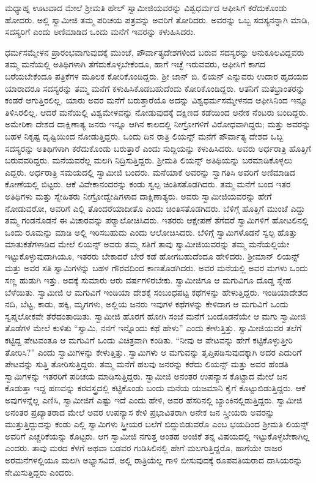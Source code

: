  ಮಧ್ಯಾಹ್ನ ಊಟವಾದ ಮೇಲೆ ಶ‍್ರೀಮತಿ ಹೇಲ್ ಸ್ವಾಮೀಜಿಯವರನ್ನು ವಿಶ್ವಧರ್ಮದ ಆಫೀಸಿಗೆ ಕರೆದುಕೊಂಡು ಹೋದರು. ಅಲ್ಲಿ ಸ್ವಾಮೀಜಿ ತಮ್ಮ ಪರಿಚಯ ಪತ್ರವನ್ನು ಅವರಿಗೆ ತೋರಿದರು. ಅವರನ್ನು ಒಬ್ಬ ಸದಸ್ಯನನ್ನಾಗಿ ಮಾಡಿ, ಸದಸ್ಯರಿಗೆ ಎಂದು ಅಣಿಮಾಡಿದ ಒಂದು ಮನೆಗೆ ಇವರನ್ನು ಕಳುಹಿಸಿದರು. 

 ಧರ್ಮಸಮ್ಮೇಳನ ಪ್ರಾರಂಭವಾಗುವುದಕ್ಕೆ ಮುಂಚೆ, ಪೌರ್ವಾತ್ಯದೇಶಗಳಿಂದ ಬರುವ ಸದಸ್ಯರನ್ನು ಅನುಕೂಲವಿದ್ದವರು ತಮ್ಮ ಮನೆಯಲ್ಲಿ ಅತಿಥಿಗಳಾಗಿ ತೆಗೆದುಕೊಳ್ಳಬೇಕೆಂದೂ, ಹಾಗೆ ಇಚ್ಛೆ ಇರುವವರು, ಆಫೀಸಿಗೆ ಕಾಗದ ಬರೆಯಬೇಕೆಂದೂ ಪತ್ರಿಕೆಗಳ ಮೂಲಕ ಕೋರಿಕೊಂಡಿದ್ದರು. ಶ‍್ರೀ ಜಾನ್ ಬಿ. ಲಿಯನ್ ಎನ್ನುವರು ಉದಾರ ಹೃದಯದ ಯಾರಾದರೂ ಸದಸ್ಯರನ್ನು ತಮ್ಮ ಮನೆಗೆ ಕಳುಹಿಸಿಕೊಡಬಹುದೆಂದು ಕೋರಿಕೊಂಡಿದ್ದರು. ಆತನಿಗೆ ಮತಭ್ರಾಂತರನ್ನು ಕಂಡರೆ ಆಗುತ್ತಿರಲಿಲ್ಲ. ಯಾರು ಅವರ ಮನೆಗೆ ಬರುತ್ತಾರೆಯೊ ಅದನ್ನು ವಿಶ್ವಧರ್ಮಸಮ್ಮೇಳನದ ಆಫೀಸಿನಿಂದ ಇನ್ನೂ ತಿಳಿಸಿರಲಿಲ್ಲ. ಆದರೆ ಮನೆಯಲ್ಲಿ ವಿಶ್ವಮೇಳವನ್ನು ನೋಡುವುದಕ್ಕೆ ದಕ್ಷಿಣದ ಕಡೆಯಿಂದ ಅನೇಕ ನೆಂಟರು ಬಂದಿದ್ದರು. ಅಮೇರಿಕಾ ದೇಶದ ದಾಕ್ಷಿಣಾತ್ಯ ಜನರು ಇನ್ನೂ ಆಗಿನ ಕಾಲದಲ್ಲಿ ನೀಗ್ರೋಗಳಿಗೆ ವಿರೋಧವಾಗಿದ್ದರು; ಮತ್ತು ಅವರನ್ನು ಬಹಳ ನಿಕೃಷ್ಟ ದೃಷ್ಟಿಯಿಂದ ನೋಡುತ್ತಿದ್ದರು. ಒಂದು ದಿನ ರಾತ್ರಿ ಲಿಯನ್ಸ್ ಮನೆಗೆ ಪೌರ್ವಾತ್ಯ ದೇಶದ ಒಬ್ಬ ಸದಸ್ಯರನ್ನು ಅತಿಥಿಗಳಾಗಿ ಕರೆದುಕೊಂಡು ಬರುತ್ತಾರೆ ಎಂದು ಸುದ್ದಿಯನ್ನು ಕಳುಹಿಸಿದರು. ಅವರು ಅರ್ಧರಾತ್ರಿ ಹೊತ್ತಿಗೆ ಬರುವವರಿದ್ದರು. ಮನೆಯವರೆಲ್ಲ ಮಲಗಿ ನಿದ್ರಿಸುತ್ತಿದ್ದರು. ಶ‍್ರೀಮತಿ ಲಿಯನ್ಸ್ ಅತಿಥಿಯನ್ನು ಬರಮಾಡಿಕೊಳ್ಳಲು ಎದ್ದರು. ಅರ್ಧರಾತ್ರಿ ಸಮಯದಲ್ಲಿ ಸ್ವಾಮೀಜಿ ಬಂದರು. ಮನೆಯಾಕೆ ಅವರನ್ನು ಸ್ವಾಗತಿಸಿ ಅವರಿಗೆ ಅಣಿಮಾಡಿದ ಕೋಣೆಯಲ್ಲಿ ಬಿಟ್ಟರು. ಆಕೆ ವಿವೇಕಾನಂದರನ್ನು ಕಂಡು ಸ್ವಲ್ಪ ಚಿಂತಿಸತೊಡಗಿದರು. ತಮ್ಮ ಮನೆಗೆ ಬಂದ ಇತರ ಅತಿಥಿಗಳು ಮತ್ತು ಸ್ನೇಹಿತರು ನೀಗ್ರೋದ್ವೇಷಿಗಳಾದ ದಾಕ್ಷಿಣಾತ್ಯರು. ಅವರು ಸ್ವಾಮೀಜಿಯವರನ್ನು ಹೇಗೆ ನೋಡುವರೋ, ಅವರಿಗೆ ಎಲ್ಲಿ ತೊಂದರೆಯಾದೀತೊ ಎಂದು ಚಿಂತಿಸತೊಡಗಿದರು. ಬೆಳಿಗ್ಗೆ ಹೊತ್ತಿಗೆ ಮುಂಚೆ ಎದ್ದು ತಮ್ಮ ಗಂಡನೊಡನೆ ಈ ವಿಚಾರವನ್ನು ಪರ‍್ಯಾಲೋಚಿಸಿದರು. ಇತರರು ಆಕ್ಷೇಪಣೆ ತೆಗೆದರೆ ಸ್ವಾಮಿಗಳಿಗೆ ಹೋಟಲಿನಲ್ಲಿ ಒಂದು ರೂಮನ್ನು ಮಾಡಿ ಅಲ್ಲಿ ಇರಿಸಬಹುದು ಎಂದು ಆಲೋಚಿಸಿದರು. ಬೆಳಿಗ್ಗೆ ಸ್ವಾಮಿಗಳೊಡನೆ ಸ್ವಲ್ಪ ಹೊತ್ತು ಮಾತುಕತೆಗಳಾಡಿದ ಮೇಲೆ ಲಿಯನ್ಸ್ ಅವರು ತಮ್ಮ ಸತಿಗೆ ತಾವು ಸ್ವಾಮೀಜಿಯವರನ್ನು ತಮ್ಮ ಮನೆಯಲ್ಲಿಯೇ ಇಟ್ಟುಕೊಳ್ಳುವುದಾಗಿಯೂ, ಇತರರು ಬೇಕಾದರೆ ಬೇರೆ ಕಡೆ ಹೋಗಬಹುದೆಂದೂ ಹೇಳಿದರು. ಶ‍್ರೀಮಾನ್ ಲಿಯನ್ಸ್ ಮತ್ತು ಅವರ ಸತಿ ಸ್ವಾಮಿಗಳನ್ನು ಬಹಳ ಗೌರವದಿಂದ ಕಾಣತೊಡಗಿದರು. ಅವರ ಮನೆಯಲ್ಲಿ ಅವರ ಮಗಳು ಒಂದು ಸಣ್ಣ ಹುಡುಗಿ ಇತ್ತು. ಅದಕ್ಕೆ ಸುಮಾರು ಆರು ವರ್ಷಗಳಿರಬೇಕು. ಸ್ವಾಮೀಜಿಗೂ ಆ ಮಗುವಿಗೂ ದೊಡ್ಡ ಸ್ನೇಹ ಬೆಳೆಯಿತು. ಸ್ವಾಮೀಜಿ ಆ ಮಗುವಿಗೆ ಇಂಡಿಯಾ ದೇಶಕ್ಕೆ ಸಂಬಂಧಪಟ್ಟ ಕಥೆಗಳನ್ನು ಹೇಳುತ್ತಿದ್ದರು. ಇಂಡಿಯಾದೇಶದ ನದಿ, ಬೆಟ್ಟ, ಕಾಡು, ಹಕ್ಕಿ, ಮೃಗಗಳು, ಅಲ್ಲಿಯ ಜನರು ಇವುಗಳ ಕಥೆಗಳನ್ನು ಕೇಳಿದಾಗ ಆ ಮಗುವಿಗೆ ಒಂದು ಸ್ವಪ್ನಲೋಕವೇ ತೆರೆದಂತಾಯಿತು. ಸ್ವಾಮೀಜಿ ಹೊರಗೆ ಹೋಗಿ ಸಂಜೆ ಮನೆಗೆ ಬಂದೊಡನೆಯೇ ಆ ಮಗು ಸ್ವಾಮೀಜಿ ತೊಡೆಗಳ ಮೇಲೆ ಕುಳಿತು “ಸ್ವಾಮಿ, ನನಗೆ ಇನ್ನೊಂದು ಕಥೆ ಹೇಳು” ಎಂದು ಕೇಳುತ್ತಿತ್ತು. ಸ್ವಾಮೀಜಿಯವರ ತಲೆಗೆ ಕಟ್ಟಿದ್ದ ಪೇಟವಂತೂ ಆ ಮಗುವಿಗೆ ಒಂದು ವಿಚಿತ್ರವಾಗಿ ಕಂಡಿತು. “ನೀವು ಆ ಪೇಟವನ್ನು ಹೇಗೆ ಕಟ್ಟಿಕೊಳ್ಳುತ್ತೀರಿ ತೋರಿಸಿ?” ಎಂದು ಸ್ವಾಮಿಗಳನ್ನು ಕೇಳುತ್ತಿತ್ತು. ಸ್ವಾಮಿಗಳು ಆ ಮಗುವನ್ನು ತೃಪ್ತಿಪಡಿಸುವುದಕ್ಕಾಗಿ ಅದರ ಎದುರಿಗೆ ಪೇಟವನ್ನು ಸುತ್ತಿ ತೋರಿಸುತ್ತಿದ್ದರು. ತಮ್ಮ ಮನೆಗೆ ಹಲವು ಜನರನ್ನು ಕರೆದು ಲಿಯನ್ಸ್ ಮತ್ತು ಅವರ ಹೆಂಡತಿ ಸ್ವಾಮಿಗಳನ್ನು ಇತರರಿಗೆ ಪರಿಚಯ ಮಾಡಿಸುತ್ತಿದ್ದರು. ಸ್ವಾಮೀಜಿ ಅನಂತರ ಉಪನ್ಯಾಸ ಕೊಟ್ಟಾದ ಮೇಲೆ ಜನ ಕೊಡುತ್ತಾ ಇದ್ದ ಹಣವನ್ನು ಕರವಸ್ತ್ರದಲ್ಲಿ ಕಟ್ಟಿಕೊಂಡು ಬಂದು ಮನೆಯ ಯಜಮಾನಿ ಕೈಗೆ ಕೊಟ್ಟುಬಿಡುತ್ತಿದ್ದರು. ಆಕೆ ಅವುಗಳನ್ನೆಲ್ಲ ಎಣಿಸಿ, ಸ್ವಾಮೀಜಿಗೆ ಎಷ್ಟು ಇದೆ ಎಂದು ಹೇಳಿ, ಅವರ ಹೆಸರಿನಲ್ಲಿ ಬ್ಯಾಂಕಿನಲ್ಲಿಡುತ್ತಿದ್ದರು. ಸ್ವಾಮೀಜಿ ಅನಂತರ ಪ್ರಖ್ಯಾತರಾದ ಮೇಲೆ ಅವರ ಉಪನ್ಯಾಸ ಕೇಳಿ ಪ್ರಭಾವಿತರಾಗಿ ಅನೇಕ ಜನ ಸ್ತ್ರೀಯರು ಅವರನ್ನು ಮುತ್ತುತ್ತಿದ್ದುದನ್ನು ಕಂಡು ಎಲ್ಲಿ ಸ್ವಾಮಿಗಳು ಸ್ತ್ರೀಯರ ಬಲೆಗೆ ಬಿದ್ದುಬಿಡುವರೊ ಎಂಬ ಭಯದಿಂದ ಶ‍್ರೀಮತಿ ಲಿಯನ್ಸ್ ಅವರಿಗೆ ಎಚ್ಚರಿಕೆಯನ್ನು ಕೊಟ್ಟರು. ಆಗ ಸ್ವಾಮೀಜಿ ನಗುತ್ತ ಅಂತಹ ಅಂಜಿಕೆ ತನ್ನ ವಿಷಯದಲ್ಲಿ ಇಟ್ಟುಕೊಳ್ಳಬೇಕಾಗಿಲ್ಲ ಎಂದರು. ತಾವು ಮರದ ಕೆಳಗೆ ಅಥವಾ ಬಡವರ ಗುಡಿಸಿಲಿನಲ್ಲಿ ಹೇಗೆ ಮಲಗುತ್ತಿದ್ದರೊ, ಹಾಗೆಯೇ ರಾಜರ ಅರಮನೆಗಳಲ್ಲಿಯೂ ಮಲಗಿ ಅಭ್ಯಾಸವಿದೆ, ಅಲ್ಲಿ ರಾತ್ರಿಯೆಲ್ಲ ಗಾಳಿ ಬೀಸುವುದಕ್ಕೆ ರೂಪವತಿಯರಾದ ದಾಸಿಯರನ್ನು ನೇಮಿಸುತ್ತಿದ್ದರು ಎಂದರು. 
